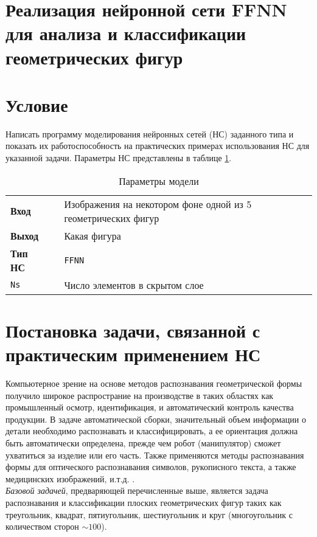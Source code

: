 \documentclass[12pt,a4paper]{article}
\newcommand{\ffnn}{\texttt{FFNN}}
\newcommand{\ns}{\texttt{Ns}}
\begin{document}
\section*{\Large\center Реализация нейронной сети FFNN
для анализа и классификации геометрических фигур}    
\section*{Условие}
\noindent
Написать программу моделирования нейронных сетей (НС) 
заданного типа и показать их работоспособность на практических примерах использования НС для указанной задачи.
Параметры НС представлены в таблице \ref{tbl:01}.

\begin{table}[h]
	\center
	\caption{Параметры модели \label{tbl:01}}
\begin{tabular}{lc|l}
\textbf{Вход} & & Изображения на некотором фоне одной из 5 геометрических фигур \\
\textbf{Выход} & & Какая фигура \\
\textbf{Тип НС} & & \ffnn \\
\textsf{\ns} &  & Число элементов в скрытом слое
\end{tabular}
\end{table}

\section{Постановка задачи, связанной с практическим \newline применением НС}
Компьютерное зрение на основе методов распознавания геометрической 
формы получило широкое распространие на производстве в таких областях 
как промышленный осмотр, идентификация, и автоматический контроль
качества продукции. 
В задаче автоматической сборки, значительный объем информации о детали
необходимо распознавать и классифицировать, а ее ориентация должна быть 
автоматически определена, прежде чем робот (манипулятор) сможет ухватиться 
за изделие или его часть. 
Также применяются методы распознавания формы
для оптического распознавания символов, рукописного текста,
а также медицинских изображений, и.т.д. \cite{hou1999}.\\[6pt]
\noindent
\emph{Базовой задачей}, предваряющей перечисленные выше, является
задача распознавания и классификации плоских геометрических фигур
таких как треугольник, квадрат, пятиугольник, шестиугольник и круг 
(многоугольник с количеством сторон $\sim100$).
\end{document}
